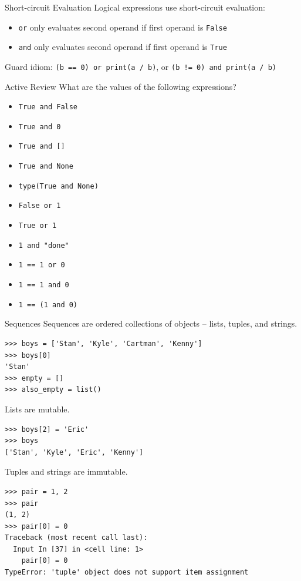 \documentclass[smaller, aspectratio=1610]{beamer}
\begin{document}
\begin{frame}[label={sec:org8794f38},fragile]{Short-circuit Evaluation}
 Logical expressions use short-circuit evaluation:

\begin{itemize}
\item \texttt{or} only evaluates second operand if first operand is \texttt{False}
\item \texttt{and} only evaluates second operand if first operand is \texttt{True}
\end{itemize}

Guard idiom: \texttt{(b == 0) or print(a / b)}, or \texttt{(b != 0) and print(a / b)}

\begin{block}{Active Review}
What are the values of the following expressions?

\begin{itemize}
\item \texttt{True and False}
\item \texttt{True and 0}
\item \texttt{True and []}
\item \texttt{True and None}
\item \texttt{type(True and None)}
\item \texttt{False or 1}
\item \texttt{True or 1}
\item \texttt{1 and "done"}
\item \texttt{1 == 1 or 0}
\item \texttt{1 == 1 and 0}
\item \texttt{1 == (1 and 0)}
\end{itemize}
\end{block}
\end{frame}


\begin{frame}[label={sec:org182c96a},fragile]{Sequences}
 Sequences are ordered collections of objects -- lists, tuples, and strings.

\lstset{language=Python,label= ,caption= ,captionpos=b,numbers=none}
\begin{lstlisting}
>>> boys = ['Stan', 'Kyle', 'Cartman', 'Kenny']
>>> boys[0]
'Stan'
>>> empty = []
>>> also_empty = list()
\end{lstlisting}

Lists are mutable.

\lstset{language=Python,label= ,caption= ,captionpos=b,numbers=none}
\begin{lstlisting}
>>> boys[2] = 'Eric'
>>> boys
['Stan', 'Kyle', 'Eric', 'Kenny']
\end{lstlisting}

Tuples and strings are immutable.

\lstset{language=Python,label= ,caption= ,captionpos=b,numbers=none}
\begin{lstlisting}
>>> pair = 1, 2
>>> pair
(1, 2)
>>> pair[0] = 0
Traceback (most recent call last):
  Input In [37] in <cell line: 1>
    pair[0] = 0
TypeError: 'tuple' object does not support item assignment
\end{lstlisting}
\end{frame}
\end{document}

